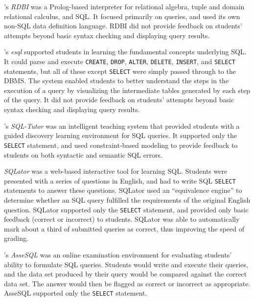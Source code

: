 \documentclass[sigconf, authordraft, capitalise]{acmart}
\begin{document}
\citeauthor{Dietrich.S-1993a-An-educational}'s \emph{RDBI} \cite{Dietrich.S-1993a-An-educational} was a Prolog-based interpreter for relational algebra, tuple and domain relational calculus, and SQL. It focused primarily on queries, and used its own non-SQL data definition language. RDBI did not provide feedback on students' attempts beyond basic syntax checking and displaying query results. 

\citeauthor{Kearns.R-1997a-A-teaching}'s \emph{esql} \cite{Kearns.R-1997a-A-teaching} supported students in learning the fundamental concepts underlying SQL. It could parse and execute \texttt{CREATE}, \texttt{DROP}, \texttt{ALTER}, \texttt{DELETE}, \texttt{INSERT}, and \texttt{SELECT} statements, but all of these except \texttt{SELECT} were simply passed through to the DBMS. The system enabled students to better understand the steps in the execution of a query by visualizing the intermediate tables generated by each step of the query. It did not provide feedback on students' attempts beyond basic syntax checking and displaying query results.

\citeauthor{Mitrovic.A-1998a-Learning}'s \emph{SQL-Tutor} \cite{Mitrovic.A-1998a-Learning} was an intelligent teaching system  that provided students with a guided discovery learning environment for SQL queries. It supported only the \texttt{SELECT} statement, and used constraint-based modeling \cite{Ohlsson.S-1992a-Constraint-based,Ohlsson.S-2016a-Constraint-based} to provide feedback to students on both syntactic and semantic SQL errors.

\citeauthor{Sadiq.S-2004a-SQLator} \emph{SQLator} \cite{Sadiq.S-2004a-SQLator} was a web-based interactive tool for learning SQL. Students were presented with a series of questions in English, and had to write SQL \texttt{SELECT} statements to answer these questions. SQLator used an ``equivalence engine'' to determine whether an SQL query fulfilled the requirements of the original English question. SQLator supported only the \texttt{SELECT} statement, and provided only basic feedback (correct or incorrect) to students. SQLator was able to automatically mark about a third of submitted queries as correct, thus improving the speed of grading. 

\citeauthor{Prior.J-2004a-Backwash}'s \emph{AsseSQL} \cite{Prior.J-2004a-Backwash} was an online examination environment for evaluating students' ability to formulate SQL queries. Students would write and execute their queries, and the data set produced by their query would be compared against the correct data set. The answer would then be flagged as correct or incorrect as appropriate. AsseSQL supported only the \texttt{SELECT} statement.
\end{document}

